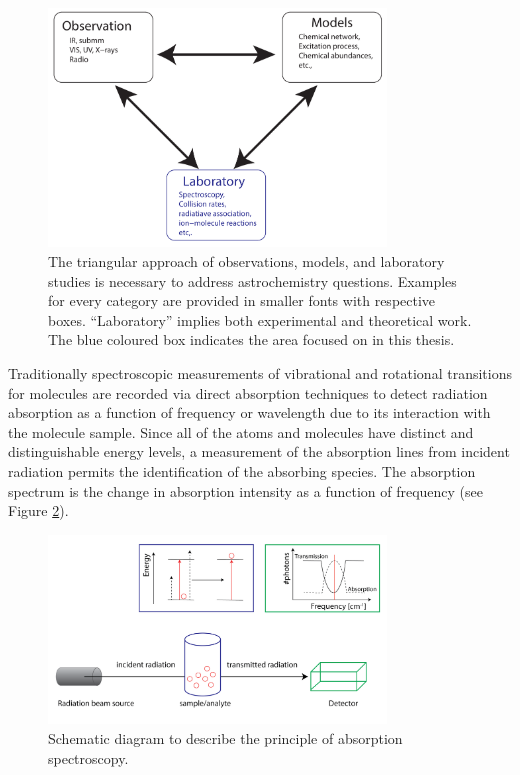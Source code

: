 \begin{figure}[!htb]
    \centering
    \includegraphics[width=0.8\textwidth]{figures/intro/astrochemistry-flow-chart.pdf}

    \caption{The triangular approach of observations, models, and laboratory studies is necessary to address astrochemistry questions. Examples for every category are provided in smaller fonts with respective boxes. \enquote{Laboratory} implies both experimental and theoretical work. The blue coloured box indicates the area focused on in this thesis.}
    \label{fig:astrochemistry-flow-chart}

\end{figure}

Traditionally spectroscopic measurements of vibrational and rotational
transitions for molecules are recorded via direct absorption techniques to
detect radiation absorption as a function of frequency or wavelength due to its
interaction with the molecule sample. Since all of the atoms and molecules have
distinct and distinguishable energy levels, a measurement of the absorption
lines from incident radiation permits the identification of the absorbing
species. The absorption spectrum is the change in absorption intensity as a
function of frequency (see Figure \ref{fig:absorption_spectroscopy}).\\

\begin{figure}[!htb]
    \centering
    \includegraphics[width=0.8\textwidth]{figures/intro/Absorption.png}
    \caption{Schematic diagram to describe the principle of absorption spectroscopy.}
    \label{fig:absorption_spectroscopy}
\end{figure}

